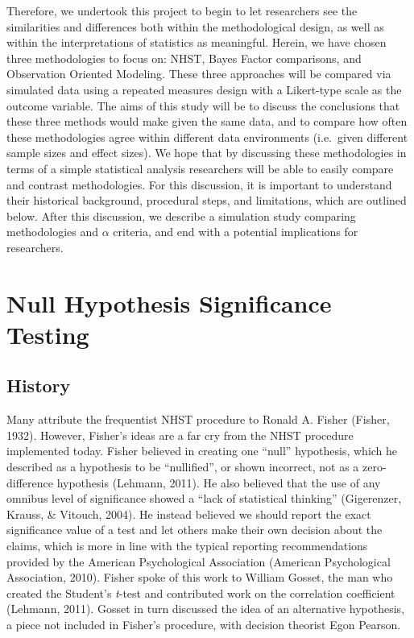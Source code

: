 \documentclass[english,man]{apa6}
\theoremstyle{definition}
\theoremstyle{definition}
\theoremstyle{definition}
\theoremstyle{remark}
\begin{document}
Therefore, we undertook this project to begin to let researchers see the
similarities and differences both within the methodological design, as
well as within the interpretations of statistics as meaningful. Herein,
we have chosen three methodologies to focus on: NHST, Bayes Factor
comparisons, and Observation Oriented Modeling. These three approaches
will be compared via simulated data using a repeated measures design
with a Likert-type scale as the outcome variable. The aims of this study
will be to discuss the conclusions that these three methods would make
given the same data, and to compare how often these methodologies agree
within different data environments (i.e.~given different sample sizes
and effect sizes). We hope that by discussing these methodologies in
terms of a simple statistical analysis researchers will be able to
easily compare and contrast methodologies. For this discussion, it is
important to understand their historical background, procedural steps,
and limitations, which are outlined below. After this discussion, we
describe a simulation study comparing methodologies and \(\alpha\)
criteria, and end with a potential implications for researchers.

\section{Null Hypothesis Significance
Testing}\label{null-hypothesis-significance-testing}

\subsection{History}\label{history}

Many attribute the frequentist NHST procedure to Ronald A. Fisher
(Fisher, 1932). However, Fisher's ideas are a far cry from the NHST
procedure implemented today. Fisher believed in creating one
\enquote{null} hypothesis, which he described as a hypothesis to be
\enquote{nullified}, or shown incorrect, not as a zero-difference
hypothesis (Lehmann, 2011). He also believed that the use of any omnibus
level of significance showed a \enquote{lack of statistical thinking}
(Gigerenzer, Krauss, \& Vitouch, 2004). He instead believed we should
report the exact significance value of a test and let others make their
own decision about the claims, which is more in line with the typical
reporting recommendations provided by the American Psychological
Association (American Psychological Association, 2010). Fisher spoke of
this work to William Gosset, the man who created the Student's
\emph{t}-test and contributed work on the correlation coefficient
(Lehmann, 2011). Gosset in turn discussed the idea of an alternative
hypothesis, a piece not included in Fisher's procedure, with decision
theorist Egon Pearson.
\end{document}
